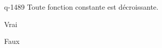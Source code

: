 \begin{truefalse}{q-1489}
Toute fonction constante est décroissante.
\item* Vrai
\item Faux
\end{truefalse}

